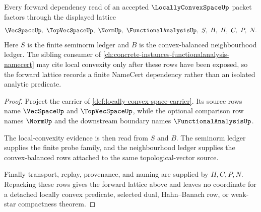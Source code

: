 \begin{theorem}
\label{thm:locally-convex-space-forward-lattice-anchor}
Every forward dependency read of an accepted $\LocallyConvexSpaceUp$ packet factors through the displayed lattice
$$
\VecSpaceUp,\ \TopVecSpaceUp,\ \NormUp,\ \FunctionalAnalysisUp,\ S,\ B,\ H,\ C,\ P,\ N .
$$
Here $S$ is the finite seminorm ledger and $B$ is the convex-balanced neighbourhood ledger. The sibling consumer of \autoref{ch:concrete-instances-functionalanalysis-namecert} may cite local convexity only after these rows have been exposed, so the forward lattice records a finite NameCert dependency rather than an isolated analytic predicate.
\end{theorem}
\begin{proof}
Project the carrier of \autoref{def:locally-convex-space-carrier}. Its source rows name $\VecSpaceUp$ and $\TopVecSpaceUp$, while the optional comparison row names $\NormUp$ and the downstream boundary names $\FunctionalAnalysisUp$.

The local-convexity evidence is then read from $S$ and $B$. The seminorm ledger supplies the finite probe family, and the neighbourhood ledger supplies the convex-balanced rows attached to the same topological-vector source.

Finally transport, replay, provenance, and naming are supplied by $H,C,P,N$. Repacking these rows gives the forward lattice above and leaves no coordinate for a detached locally convex predicate, selected dual, Hahn--Banach row, or weak-star compactness theorem.
\end{proof}
